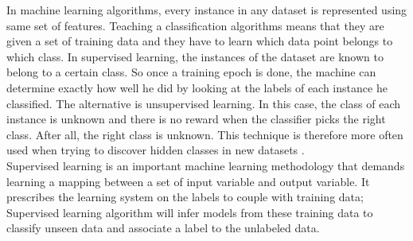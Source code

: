 In machine learning algorithms, every instance in any dataset is represented using same set of features. Teaching a classification algorithms means that they are given a set of training data and they have to learn which data point belongs to which class. In supervised learning, the instances of the dataset are known to belong to a certain class. So once a training epoch is done, the machine can determine exactly how well he did by looking at the labels of each instance he classified. The alternative is unsupervised learning. In this case, the class of each instance is unknown and there is no reward when the classifier picks the right class. After all, the right class is unknown. This technique is therefore more often used when trying to discover hidden classes in new datasets \cite{maglogiannis2007emerging}.\\

Supervised learning is an important machine learning methodology that demands learning a mapping between a set of input variable and output variable. It prescribes the learning system on the labels to couple with training data; Supervised learning algorithm will infer models from these training data to classify unseen data and associate a label to the unlabeled data.\cite{cord2008machine}\\  



